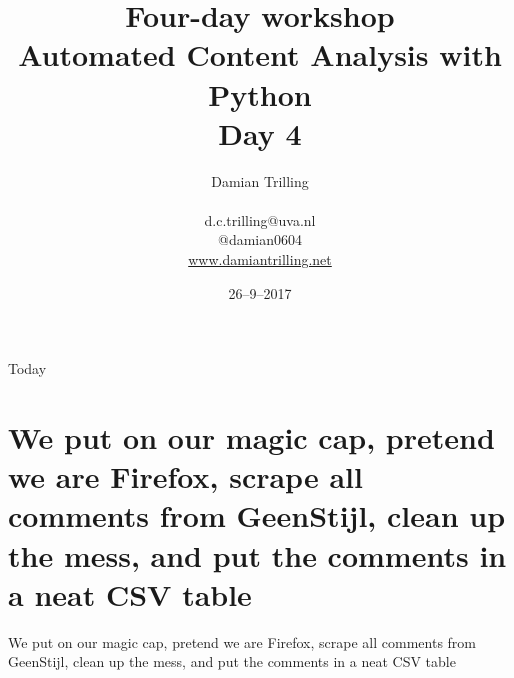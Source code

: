 \documentclass{beamer}
\begin{document}
\title[Automated Content Analysis with Python]{\textbf{Four-day workshop\\ Automated Content Analysis with Python} \\ Day 4}
\author[Damian Trilling]{Damian Trilling \\ ~ \\ \footnotesize{d.c.trilling@uva.nl \\@damian0604} \\ \url{www.damiantrilling.net}}
\date{26--9--2017}

\begin{frame}{}
\titlepage
\end{frame}

\begin{frame}{Today}
\tableofcontents
\end{frame}



\section[Magic Cap]{We put on our magic cap, pretend we are Firefox, scrape all comments from GeenStijl, clean up the mess, and put the comments in a neat CSV table}

\begin{frame}
We put on our magic cap, pretend we are Firefox, scrape all comments from GeenStijl, clean up the mess, and put the comments in a neat CSV table
\end{frame}
\end{document}
